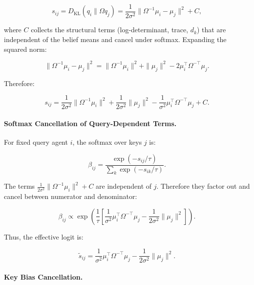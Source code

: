 \documentclass[twoside,11pt]{article}
\begin{document}
\begin{equation}
s_{ij} = D_{\mathrm{KL}}(q_i \| \Omega q_j) = \frac{1}{2\sigma^2}\|\Omega^{-1}\mu_i - \mu_j\|^2 + C,
\end{equation}

where $C$ collects the structural terms (log-determinant, trace, $d_k$) that are independent of the belief means and cancel under softmax. Expanding the squared norm:

\begin{equation}
\|\Omega^{-1}\mu_i - \mu_j\|^2 = \|\Omega^{-1}\mu_i\|^2 + \|\mu_j\|^2 - 2\mu_i^\top \Omega^{-\top} \mu_j.
\end{equation}

Therefore:

\begin{equation}
s_{ij} = \frac{1}{2\sigma^2}\|\Omega^{-1}\mu_i\|^2 + \frac{1}{2\sigma^2}\|\mu_j\|^2 - \frac{1}{\sigma^2}\mu_i^\top \Omega^{-\top}\mu_j + C.
\end{equation}

\paragraph{Softmax Cancellation of Query-Dependent Terms.}

For fixed query agent $i$, the softmax over keys $j$ is:

\begin{equation}
\beta_{ij} = \frac{\exp(-s_{ij}/\tau)}{\sum_k \exp(-s_{ik}/\tau)}.
\end{equation}

The terms $\frac{1}{2\sigma^2}\|\Omega^{-1}\mu_i\|^2 + C$ are independent of $j$. Therefore they factor out and cancel between numerator and denominator:

\begin{equation}
\beta_{ij} \propto \exp\left(\frac{1}{\tau}\left[\frac{1}{\sigma^2}\mu_i^\top\Omega^{-\top}\mu_j - \frac{1}{2\sigma^2}\|\mu_j\|^2\right]\right).
\end{equation}

Thus, the effective logit is:

\begin{equation}
\tilde{s}_{ij} = \frac{1}{\sigma^2}\mu_i^\top\Omega^{-\top}\mu_j - \frac{1}{2\sigma^2}\|\mu_j\|^2.
\end{equation}

\paragraph{Key Bias Cancellation.}
\end{document}
